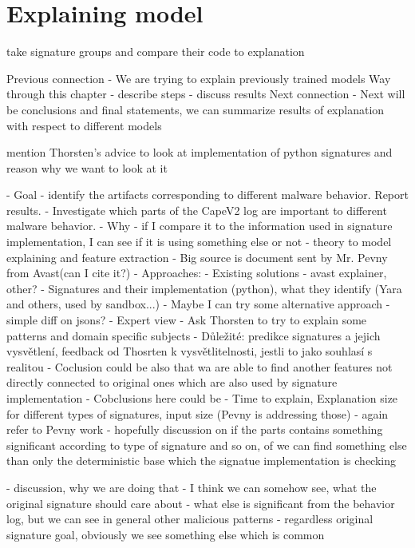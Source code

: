 \chapter{Explaining model}


take signature groups and compare their code to explanation


Previous connection
- We are trying to explain previously trained models
Way through this chapter
- describe steps
- discuss results
Next connection
- Next will be conclusions and final statements, we can summarize results of explanation with respect to different models


mention Thorsten's advice to look at implementation of python signatures and reason why we want to look at it

- Goal 
- identify the artifacts corresponding to different malware behavior. Report results.
- Investigate which parts of the CapeV2 log are important to different malware behavior. 
- Why - if I compare it to the information used in signature implementation, I can see if it is using something else or not
- theory to model explaining and feature extraction - Big source is document sent by Mr. Pevny from Avast(can I cite it?)
- Approaches:
- Existing solutions - avast explainer, other?
- Signatures and their implementation (python), what they identify (Yara and others, used by sandbox...)
- Maybe I can try some alternative approach - simple diff on jsons?
- Expert view
  - Ask Thorsten to try to explain some patterns and domain specific subjects 
  - Důležité: predikce signatures a jejich vysvětlení, feedback od Thosrten k vysvětlitelnosti, jestli to jako souhlasí s realitou 
- Coclusion could be also that wa are able to find another features not directly connected to original ones which are also used by signature implementation
- Cobclusions here could be
- Time to explain, Explanation size for different types of signatures, input size (Pevny is addressing those)
- again refer to Pevny work
- hopefully discussion on if the parts contains something significant according to type of signature and so on, of we can find something else than only the deterministic base which the signatue implementation is checking



- discussion, why we are doing that - I think we can somehow see, what the original signature should care about - what else is significant from the behavior log, but we can see in general other malicious patterns - regardless original signature goal, obviously we see something else which is common